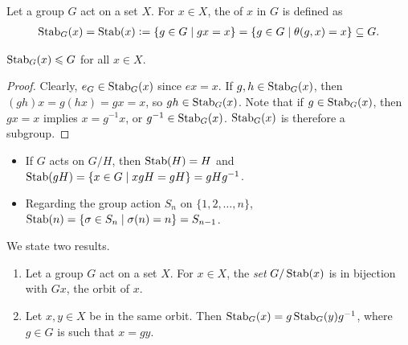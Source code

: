 \begin{definition}
    Let a group $G$ act on a set $X$. For $x \in X$, the  of $x$ in $G$ is defined as
    \begin{align}
        \operatorname{Stab}_{G}(x) = \operatorname{Stab}(x) \vcentcolon= \{g \in G \mid gx = x\} = \{g \in G \mid \theta(g,x) = x\} \subseteq G.
    \end{align}
\end{definition}

\begin{proposition}
    $\operatorname{Stab}_{G}(x) \leqslant G$ for all $x \in X$.
\end{proposition}
\begin{proof}
    Clearly, $e_{G} \in \operatorname{Stab}_{G}(x)$ since $ex = x$. If $g,h \in \operatorname{Stab}_{G}(x)$, then $(gh)x = g(hx) = gx = x$, so $gh \in \operatorname{Stab}_{G}(x)$. Note that if $g \in \operatorname{Stab}_{G}(x)$, then $gx = x$ implies $x = g^{-1}x$, or $g^{-1} \in \operatorname{Stab}_{G}(x)$. $\operatorname{Stab}_{G}(x)$ is therefore a subgroup.
\end{proof}

\begin{example}
    \begin{itemize}
        \item If $G$ acts on $G/H$, then $\operatorname{Stab}(H) = H$ and $\operatorname{Stab}(gH) = \{x \in G \mid xgH = gH\} = gHg^{-1}$.
        \item Regarding the group action $S_{n}$ on $\{1,2,\ldots,n\}$, $\operatorname{Stab}(n) = \{ \sigma \in S_{n} \mid \sigma(n) = n\} = S_{n-1}$.
    \end{itemize}
\end{example}

\begin{proposition}
    We state two results.
    \begin{enumerate}
        \item Let a group $G$ act on a set $X$. For $x \in X$, the \textit{set} $G/\operatorname{Stab}(x)$ is in bijection with $Gx$, the orbit of $x$.
        \item Let $x,y \in X$ be in the same orbit. Then $\operatorname{Stab}_{G}(x) = g\operatorname{Stab}_{G}(y)g^{-1}$, where $g \in G$ is such that $x = gy$.
    \end{enumerate}
\end{proposition}


